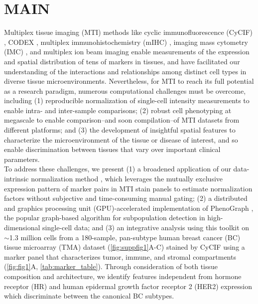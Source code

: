 \documentclass[preprint,review,3p,12pt]{elsarticle}
\begin{document}
\linenumbers

\section{MAIN}
\label{S:1}
Multiplex tissue imaging (MTI) methods like cyclic  immunofluorescence (CyCIF) \cite{cycif2018, cmif2020}, CODEX \cite{codex2018}, multiplex immunohistochemistry (mIHC) \cite{mIHC2017}, imaging mass cytometry (IMC) \cite{imc2014}, and multiplex ion beam imaging \cite{mibi2014} enable measurements of the expression and spatial distribution of tens of markers in tissues, and have facilitated our understanding of the interactions and relationships among distinct cell types in diverse tissue microenvironments. Nevertheless, for MTI to reach its full potential as a research paradigm, numerous computational challenges must be overcome, including (1) reproducible normalization of single-cell intensity measurements to enable intra- and inter-sample comparisons; (2) robust cell phenotyping at megascale to enable comparison--and soon compilation--of MTI datasets from different platforms; and (3) the development of insightful spatial features to characterize the microenvironment of the tissue or disease of interest, and so enable discrimination between tissues that vary over important clinical parameters.\\

To address these challenges, we present (1) a broadened application of our data-intrinsic normalization method \cite{Chang2020}, which leverages the mutually exclusive expression pattern of marker pairs in MTI stain panels to estimate normalization factors without subjective and time-consuming manual gating; (2) a distributed and graphics processing unit (GPU)-accelerated implementation of PhenoGraph \cite{Levine2015}, the popular graph-based algorithm for subpopulation detection in high-dimensional single-cell data; and (3) an integrative analysis using this toolkit on $\sim$1.3 million cells from a 180-sample, pan-subtype human breast cancer (BC) tissue microarray (TMA) dataset (\autoref{fig:suppfig1}A-C) stained by CyCIF using a marker panel that characterizes tumor, immune, and stromal compartments (\autoref{fig:fig1}A, \autoref{tab:marker_table}). Through consideration of both tissue composition and architecture, we identify features independent from hormone receptor (HR) and human epidermal growth factor receptor 2 (HER2) expression which discriminate between the canonical BC subtypes.\\
\end{document}
